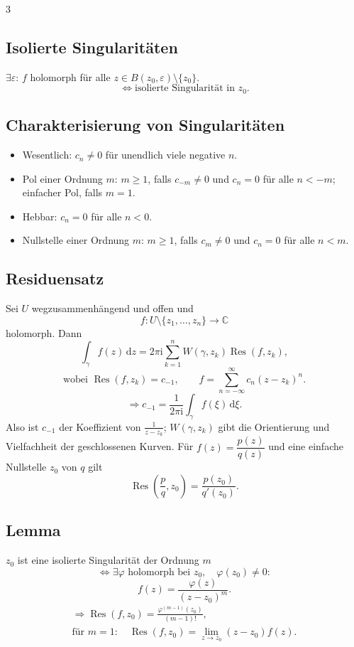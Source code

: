 \documentclass[a4paper,landscape]{article}
\newcommand{\C}{\mathbb C}
\newcommand{\dd}{\,\mathrm d}
\newcommand{\ii}{\mathrm i}
\DeclareMathOperator{\Res}{Res}
\begin{document}
\begin{multicols*}{3}
\subsection*{Isolierte Singularitäten}
$\exists\varepsilon$: $f$ holomorph für alle $z\in B(z_0,\varepsilon)\setminus\{z_0\}$.
\[
\Leftrightarrow \text{isolierte Singularität in }z_0.
\]

\subsection*{Charakterisierung von Singularitäten}
\begin{itemize}
\item Wesentlich: $c_n\ne0$ für unendlich viele negative $n$.
\item Pol einer Ordnung $m$: $m\ge1$, falls $c_{-m}\ne0$ und $c_n=0$ für alle $n<-m$; einfacher Pol, falls $m=1$.
\item Hebbar: $c_n=0$ für alle $n<0$.
\item Nullstelle einer Ordnung $m$: $m\ge1$, falls $c_m\ne0$ und $c_n=0$ für alle $n<m$.
\end{itemize}

\subsection*{Residuensatz}
Sei $U$ wegzusammenhängend und offen und
\[
f:U\setminus\{z_1,\ldots,z_n\}\to\C
\]
holomorph. Dann
\[
\int_\gamma f(z)\dd z=2\pi\ii\sum_{k=1}^{n}W(\gamma,z_k)\Res(f,z_k),
\]
\[
\text{wobei }\Res(f,z_k)=c_{-1},\qquad f=\sum_{n=-\infty}^{\infty}c_n(z-z_k)^n.
\]
\[
\Rightarrow c_{-1}=\frac{1}{2\pi\ii}\int_\gamma f(\xi)\dd\xi.
\]
Also ist $c_{-1}$ der Koeffizient von $\frac{1}{z-z_k}$; $W(\gamma,z_k)$ gibt die Orientierung und Vielfachheit der geschlossenen Kurven.
Für $f(z)=\dfrac{p(z)}{q(z)}$ und eine einfache Nullstelle $z_0$ von $q$ gilt
\[
\Res\left(\frac{p}{q},z_0\right)=\frac{p(z_0)}{q'(z_0)}.
\]

\subsection*{Lemma}
$z_0$ ist eine isolierte Singularität der Ordnung $m$
\[
\Leftrightarrow\exists\varphi\text{ holomorph bei }z_0,\quad \varphi(z_0)\ne0:
\]
\[
f(z)=\frac{\varphi(z)}{(z-z_0)^m}.
\]
\[
\begin{gathered}
\Rightarrow \Res(f,z_0)=\frac{\varphi^{(m-1)}(z_0)}{(m-1)!},\\
\text{für }m=1:\quad \Res(f,z_0)=\lim_{z\to z_0}(z-z_0)f(z).
\end{gathered}
\]


\end{multicols*}
\end{document}

